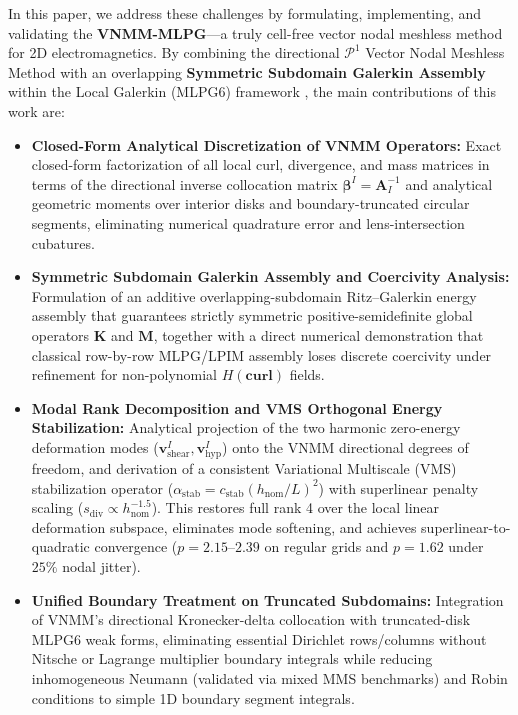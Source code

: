 \documentclass[preprint,12pt]{elsarticle}
\begin{document}
In this paper, we address these challenges by formulating, implementing, and validating the \textbf{VNMM-MLPG}---a truly cell-free vector nodal meshless method for 2D electromagnetics. By combining the directional $\mathcal{P}^1$ Vector Nodal Meshless Method \cite{ortiz2021nodal, stable_vnmm2d_2026} with an overlapping \textbf{Symmetric Subdomain Galerkin Assembly} within the Local Galerkin (MLPG6) framework \cite{atluri2002meshless}, the main contributions of this work are:
\begin{itemize}
    \item \textbf{Closed-Form Analytical Discretization of VNMM Operators:} Exact closed-form factorization of all local curl, divergence, and mass matrices in terms of the directional inverse collocation matrix $\boldsymbol{\beta}^I = \mathbf{A}_I^{-1}$ and analytical geometric moments over interior disks and boundary-truncated circular segments, eliminating numerical quadrature error and lens-intersection cubatures.
    \item \textbf{Symmetric Subdomain Galerkin Assembly and Coercivity Analysis:} Formulation of an additive overlapping-subdomain Ritz--Galerkin energy assembly that guarantees strictly symmetric positive-semidefinite global operators $\mathbf{K}$ and $\mathbf{M}$, together with a direct numerical demonstration that classical row-by-row MLPG/LPIM assembly loses discrete coercivity under refinement for non-polynomial $H(\mathbf{curl})$ fields.
    \item \textbf{Modal Rank Decomposition and VMS Orthogonal Energy Stabilization:} Analytical projection of the two harmonic zero-energy deformation modes ($\mathbf{v}_{\mathrm{shear}}^I, \mathbf{v}_{\mathrm{hyp}}^I$) onto the VNMM directional degrees of freedom, and derivation of a consistent Variational Multiscale (VMS) stabilization operator ($\alpha_{\mathrm{stab}} = c_{\mathrm{stab}}(h_{\mathrm{nom}}/L)^2$) with superlinear penalty scaling ($s_{\mathrm{div}} \propto h_{\mathrm{nom}}^{-1.5}$). This restores full rank 4 over the local linear deformation subspace, eliminates mode softening, and achieves superlinear-to-quadratic convergence ($p = 2.15\text{--}2.39$ on regular grids and $p = 1.62$ under $25\%$ nodal jitter).
    \item \textbf{Unified Boundary Treatment on Truncated Subdomains:} Integration of VNMM's directional Kronecker-delta collocation \cite{ortiz2021nodal, stable_vnmm2d_2026} with truncated-disk MLPG6 weak forms, eliminating essential Dirichlet rows/columns without Nitsche or Lagrange multiplier boundary integrals while reducing inhomogeneous Neumann (validated via mixed MMS benchmarks) and Robin conditions to simple 1D boundary segment integrals.

\end{itemize}
\end{document}
